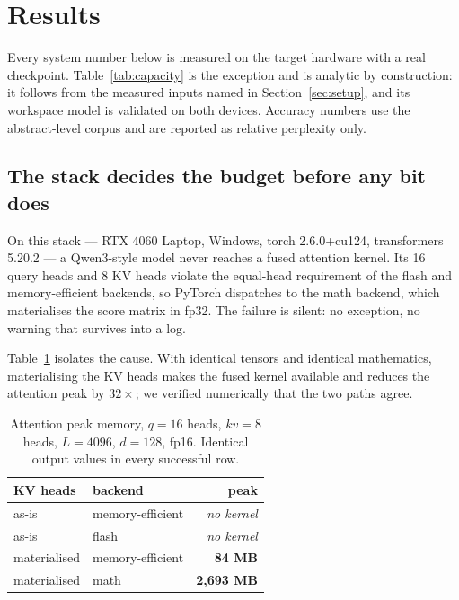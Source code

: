\documentclass[5p]{elsarticle}
\begin{document}
\section{Results}
\label{sec:results}

Every system number below is measured on the target hardware with a real
checkpoint. Table~\ref{tab:capacity} is the exception and is analytic by
construction: it follows from the measured inputs named in
Section~\ref{sec:setup}, and its workspace model is validated on both devices.
Accuracy numbers use the abstract-level corpus and are reported as relative
perplexity only.

\subsection{The stack decides the budget before any bit does}
\label{sec:results-stack}

On this stack --- RTX 4060 Laptop, Windows, torch 2.6.0+cu124, transformers
5.20.2 --- a Qwen3-style model never reaches a fused attention kernel. Its 16
query heads and 8 KV heads violate the equal-head requirement of the flash and
memory-efficient backends, so PyTorch dispatches to the math backend, which
materialises the score matrix in fp32. The failure is silent: no exception, no
warning that survives into a log.

Table~\ref{tab:gqa} isolates the cause. With identical tensors and identical
mathematics, materialising the KV heads makes the fused kernel available and
reduces the attention peak by $32\times$; we verified numerically that the two
paths agree.

\begin{table}[t]
\centering
\caption{Attention peak memory, $q{=}16$ heads, $kv{=}8$ heads, $L{=}4096$,
$d{=}128$, fp16. Identical output values in every successful row.}
\label{tab:gqa}
\begin{tabular}{llr}
\toprule
KV heads & backend & peak \\
\midrule
as-is & memory-efficient & \emph{no kernel} \\
as-is & flash & \emph{no kernel} \\
materialised & memory-efficient & \textbf{84 MB} \\
materialised & math & \textbf{2{,}693 MB} \\
\bottomrule
\end{tabular}
\end{table}
\end{document}
